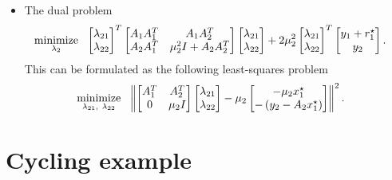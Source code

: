 \documentclass[12pt]{article}
\begin{document}
\begin{itemize}
\item The dual problem
%
\begin{align*}
\mathop{\mbox{minimize}}_{\lambda_{2}} \ \  &
\begin{bmatrix} \lambda_{21} \\ \lambda_{22} \end{bmatrix}^T
\begin{bmatrix} A_1A_1^T & A_1A_2^T \\ A_2A_1^T & \mu_2^2 I+A_2A_2^T \end{bmatrix}
\begin{bmatrix} \lambda_{21} \\ \lambda_{22} \end{bmatrix} +
2\mu_2^2
\begin{bmatrix} \lambda_{21} \\ \lambda_{22} \end{bmatrix}^T \begin{bmatrix} y_1+r_1^{\star} \\ y_2 \end{bmatrix}.
\end{align*}
%
This can be formulated as the following least-squares problem
%
\begin{align*}
  \mathop{\mbox{minimize}}_{\lambda_{21},\ \lambda_{22}} \ \  & \left\lVert\begin{bmatrix}A_1^T & A_2^T \\ 0 & \mu_2I \end{bmatrix}
    \begin{bmatrix} \lambda_{21} \\ \lambda_{22} \end{bmatrix} -
    \mu_2\begin{bmatrix} -\mu_2 x_1^{\star} \\ -\left(y_2 - A_2x_1^{\star}\right) \end{bmatrix}\right\rVert^2.
\end{align*}

\end{itemize}

\section{Cycling example}
\end{document}
